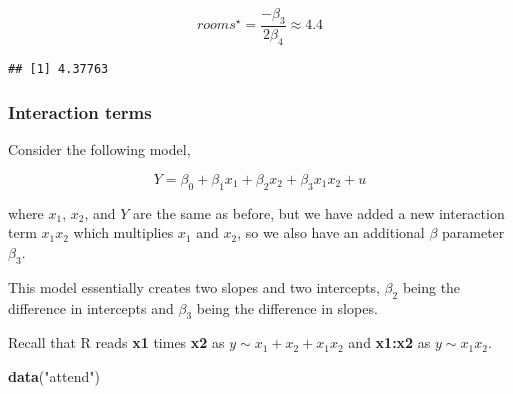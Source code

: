 \documentclass[]{book}
\newenvironment{Shaded}{\begin{snugshade}}{\end{snugshade}}
\newcommand{\DecValTok}[1]{\textcolor[rgb]{0.00,0.00,0.81}{#1}}
\newcommand{\KeywordTok}[1]{\textcolor[rgb]{0.13,0.29,0.53}{\textbf{#1}}}
\newcommand{\NormalTok}[1]{#1}
\newcommand{\OperatorTok}[1]{\textcolor[rgb]{0.81,0.36,0.00}{\textbf{#1}}}
\newcommand{\StringTok}[1]{\textcolor[rgb]{0.31,0.60,0.02}{#1}}
\begin{document}
\begin{equation}
rooms^{\star} = \frac{-\beta_3}{2\beta_4} \approx 4.4
\end{equation}

\begin{Shaded}
\end{Shaded}

\begin{verbatim}
## [1] 4.37763
\end{verbatim}

\hypertarget{interaction-terms}{%
\subsubsection{Interaction terms}\label{interaction-terms}}

Consider the following model,

\begin{equation}
Y = {\beta}_{0} + {\beta}_{1}x_{1} +  {\beta}_{2}x_{2} + {\beta}_{3}x_{1}x_{2} + u    
\label{eq:interactionterm}
\end{equation}

where \(x_1\), \(x_2\), and \(Y\) are the same as before, but we have
added a new interaction term \(x_1x_2\) which multiplies \(x_1\) and
\(x_2\), so we also have an additional \(\beta\) parameter \(\beta_3\).

This model essentially creates two slopes and two intercepts,
\(\beta_2\) being the difference in intercepts and \(\beta_3\) being the
difference in slopes.

Recall that R reads \textbf{x1} times \textbf{x2} as
\(y \sim x_1+x_2+x_1x_2\) and \textbf{x1:x2} as \(y \sim x_1x_2\).

\begin{Shaded}
\begin{Highlighting}[]
\KeywordTok{data}\NormalTok{(}\StringTok{"attend"}\NormalTok{)}
\end{Highlighting}
\end{Shaded}
\end{document}
